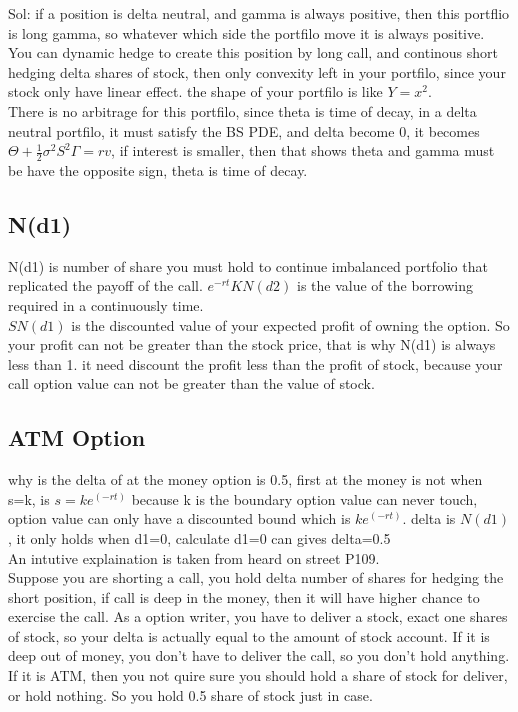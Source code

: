 \documentclass[a4paper,11pt]{article}
\begin{document}
Sol: if a position is delta neutral, and gamma is always positive, then this portflio is long gamma, so whatever which side the portfilo move it is always positive. You can dynamic hedge to create this position by long call, and continous short hedging delta shares of stock, then only convexity left in your portfilo, since your stock only have linear effect. the shape of your portfilo is like $Y=x^2$.\\
There is no arbitrage for this portfilo, since theta is time of decay, in a delta neutral portfilo, it must satisfy the BS PDE, and delta become 0, it becomes $\Theta+\frac{1}{2}\sigma^2S^2\Gamma=rv$, if interest is smaller, then that shows theta and gamma must be have the opposite sign, theta is time of decay.
\subsection{N(d1)}
N(d1) is number of share you must hold to continue imbalanced portfolio that replicated the payoff of the call. 
$e^{-rt}KN(d2)$ is the value of the borrowing required in a continuously time.\\
 $SN(d1)$ is the discounted value of your expected profit of owning the option. So your profit can not be greater than the stock price, that is why N(d1) is always less than 1. it need discount the profit less than the profit of stock, because your call option value can not be greater than the value of stock.

\subsection{ATM Option}
why is the delta of at the money option is 0.5, first at the money is not when s=k, is $s=ke^(-rt)$ because k is the boundary option value can never touch, option value can only have a discounted bound which is $ke^(-rt)$. delta is $N(d1)$, it only holds when d1=0, calculate d1=0 can gives delta=0.5\\
An intutive explaination is taken from heard on street P109.\\
Suppose you are shorting a call, you hold delta number of shares for hedging the short position, if call is deep in the money, then it will have higher chance to exercise the call. As a option writer, you have to deliver a stock, exact one shares of stock, so your delta is actually equal to the amount of stock account. If it is deep out of money, you don't have to deliver the call, so you don't hold anything. If it is ATM, then you not quire sure you should hold a share of stock for deliver, or hold nothing. So you hold 0.5 share of stock just in case. 
\end{document}
